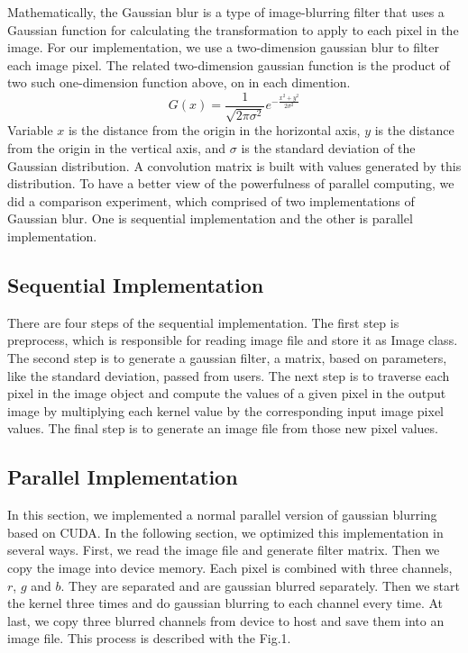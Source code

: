 \documentclass[journal,11pt,onecolumn,draftclsnofoot]{ieeeconf}  %
\begin{document}
Mathematically, the Gaussian blur is a type of image-blurring filter that uses a Gaussian function for calculating the transformation to apply to each pixel in the image.  For our implementation, we use a two-dimension gaussian blur to filter each image pixel. The related two-dimension gaussian function is the product of two such one-dimension function above, on in each dimention. 
  \[G(x) = \frac{1}{ \sqrt{2 \pi   \sigma ^{2} } } e^{ -\frac{ x^{2} +  y^{2}}{2  \sigma ^{2} }}\]
 Variable $x$ is the distance from the origin in the horizontal axis, $y$ is the distance from the origin in the vertical axis, and $\sigma$ is the standard deviation of the Gaussian distribution. A convolution matrix is built with values generated by this distribution.  
 To have a better view of the powerfulness of parallel computing, we did a comparison experiment, which comprised of two implementations of Gaussian blur. One is sequential implementation and the other is parallel implementation. 

\subsection{Sequential  Implementation}\label{Sequential}
There are four steps of the sequential implementation. The first step is preprocess, which is responsible for reading image file and store it as Image class. The second step is to generate a gaussian filter, a matrix, based on parameters, like the standard deviation,  passed from users. The next step is to traverse each pixel in the image object and compute the values of a given pixel in the output image by multiplying each kernel value by the corresponding input image pixel values. The final step is to generate an image file from those new pixel values.

\subsection{Parallel  Implementation} \label{GPU}
In this section, we implemented a normal parallel version of gaussian blurring based on CUDA. In the following section, we optimized this implementation in several ways.  First, we read the image file and generate filter matrix. Then we copy the image into device memory. Each pixel is combined with three channels, $r$, $g$ and $b$.  They are separated and are gaussian blurred separately. Then we start the kernel three times and do gaussian blurring to each channel every time.  At last, we copy three blurred channels from device to host and save them into an image file. This process is described with the Fig.1.
\end{document}
